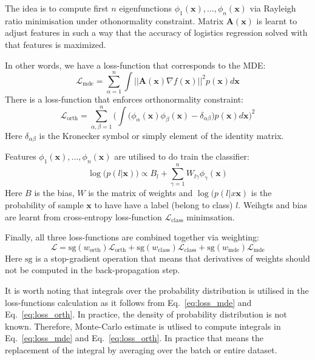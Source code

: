 \documentclass{article}
\theoremstyle{plain}
\theoremstyle{definition}
\theoremstyle{remark}
\begin{document}
The idea is to compute first $n$ eigenfunctions $\phi_1(\mathbf{x}), ..., \phi_n(\mathbf{x})$ via Rayleigh ratio minimisation under othonormality constraint.
Matrix $\mathbf{A}(\mathbf{x})$ is learnt to adjust features in such a way that the accuracy of logistics regression 
solved with that features is maximized.

In other words, we have a loss-function that corresponds to the MDE:
\begin{equation}
    \label{eq:loss_mde}
    \mathcal{L}_{\text{mde}} = \sum_{\alpha=1}^{n} \int ||\mathbf{A}(\mathbf{x}) \nabla f(\mathbf{x})||^2 p(\mathbf{x}) d\mathbf{x}
\end{equation}
There is a loss-function that enforces orthonormality constraint:
\begin{equation}
    \label{eq:loss_orth}
    \mathcal{L}_{\text{orth}} = \sum_{\alpha, \beta=1}^{n} \bigg(\int \big(\phi_{\alpha}(\mathbf{x}) \phi_{\beta}(\mathbf{x}) - \delta_{\alpha\beta}\big) p(\mathbf{x}) d\mathbf{x} \bigg)^2
\end{equation}
Here $\delta_{\alpha\beta}$ is the Kronecker symbol or simply element of the identity matrix.

Features $\phi_1(\mathbf{x}), ..., \phi_n(\mathbf{x})$ are utilised to do train the classifier:
\begin{equation}
    \label{eq:class_log_prob}
    \log\big(p(l|\mathbf{x})\big) \propto B_l + \sum_{\gamma=1}^{n} W_{l\gamma} \phi_{\gamma}(\mathbf{x})
\end{equation}
Here $B$ is the bias, $W$ is the matrix of weights and $\log(p(l|x\mathbf{x})$ is the probability of sample $\mathbf{x}$
to have have a label (belong to class) $l$.
Weihgts and bias are learnt from cross-entropy loss-function $\mathcal{L}_{\text{class}}$ minimsation.
  
Finally, all three loss-functions are combined together via weighting:
\begin{equation}
    \label{eq:loss_function}
    \mathcal{L} = \text{sg}(w_{\text{orth}}) \mathcal{L}_{\text{orth}} + \text{sg}(w_{\text{class}}) \mathcal{L}_{\text{class}} + \text{sg}(w_{\text{mde}}) \mathcal{L}_{\text{mde}} 
\end{equation}
Here $\text{sg}$ is a stop-gradient operation that means that derivatives of weights should not be computed in 
the back-propagation step.

It is worth noting that integrals over the probability distribution is utilised in the loss-functions calculation
as it follows from Eq.~\eqref{eq:loss_mde} and Eq.~\eqref{eq:loss_orth}.
In practice, the density of probability distribution is not known.
Therefore, Monte-Carlo estimate is utlised to compute integrals in Eq.~\eqref{eq:loss_mde} and Eq.~\eqref{eq:loss_orth}.
In practice that means the replacement of the integral by averaging over the batch or entire dataset.
\end{document}

